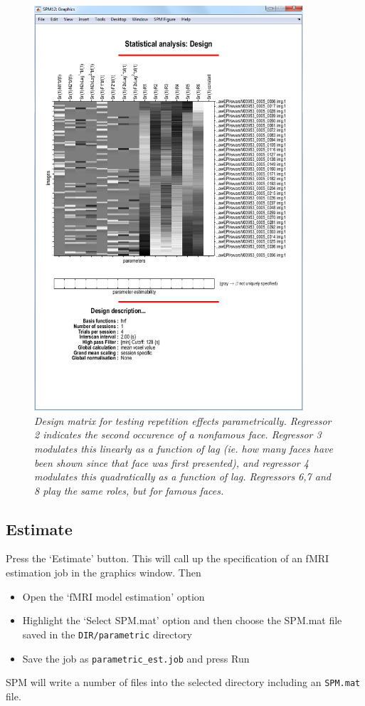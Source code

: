 \documentclass[a4paper,titlepage]{book}
\newcommand{\bi}{\begin{itemize}}
\newcommand{\ei}{\end{itemize}}
\begin{document}
\begin{figure}
\begin{center}
\includegraphics[width=100mm]{par_design}
\caption{\em Design matrix for testing repetition effects parametrically. Regressor 2 indicates the second occurence of a nonfamous face. Regressor 3 modulates this linearly as a function of lag (ie. how many faces have been shown since that face was first presented), and regressor 4 modulates this quadratically as a function of lag. Regressors 6,7 and 8 play the same roles, but for famous faces. \label{par_design} }
\end{center}
\end{figure}

\subsection{Estimate}

Press the `Estimate' button. This will call up the specification of an fMRI estimation job in the graphics window. Then
\bi
\item{Open the `fMRI model estimation' option}
\item{Highlight the `Select SPM.mat' option and then choose the SPM.mat
file saved in the \verb!DIR/parametric! directory}
\item{Save the job as \verb!parametric_est.job! and press Run}
\ei
SPM will write a number of files into the selected directory including 
an \verb!SPM.mat! file.
\end{document}
